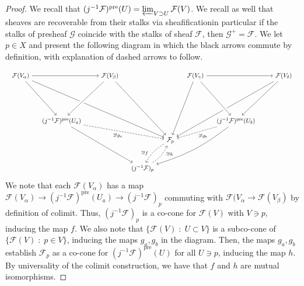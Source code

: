 \documentclass[english,letter,doublesided]{article}
\newcommand{\Fcal}{\mathcal{F}}
\newcommand{\Gcal}{\mathcal{G}}
\theoremstyle{remark}
\theoremstyle{definition}
\newcommand{\clim}{\varprojlim}
\newcommand{\pre}{\mathrm{pre}}
\begin{document}
\begin{proof}
	We recall that $(j^{-1}\Fcal)^{\pre}(U)=\clim_{V\supset U}\Fcal(V)$. We recall as well that sheaves are recoverable from their stalks via sheafification\textemdash in particular if the stalks of presheaf $\Gcal$ coincide with the stalks of sheaf $\Fcal$, then $\Gcal^+=\Fcal.$ We let $p\in X$ and present the following diagram in which the black arrows commute by definition, with explanation of dashed arrows to follow.
	
	$$
	\begin{tikzcd}[row sep=scriptsize, column sep=tiny]
	&\Fcal(V_\alpha)\arrow[rrrrrr]\arrow[ddddrr]\arrow[dddddrrrrrrrrrr]&&&&&&\Fcal(V_\beta)\arrow[ddddllll,crossing over]\arrow[dddddrrrr]&&&&&&\Fcal(V_\gamma)\arrow[rrrrrr]\arrow[dddddll]&&&&&&\Fcal(V_\delta)\arrow[ddddllll]\arrow[dddddllllllll]&\\%
	&&&&&&&&&&&&&&&&&&&\\%
	&&&&&&&&&&&&&&&&&&&\\%
	&&&&&&&&&&&&&&&&&&&\\%
	&&&(j^{-1}\Fcal)^{\pre}(U_a)\arrow[dddrrrrrr]\arrow[drrrrrrrr,dashrightarrow,swap,"\exists!g_a"]&&&&&&&&&&&&(j^{-1}\Fcal)^{\pre}(U_b)\arrow[dllll,dashrightarrow,"\exists!g_b"]\arrow[from=uuuull,crossing over]\arrow[dddllllll, bend left =10]&&&&&\\%
	&&&&&&&&&&&\Fcal_p\arrow[ddll,bend right=15,dashrightarrow, near end, swap, "\exists! f"]&&&&&&&&\\%
	&&&&&&&&&&&&&&&&&&&\\%
	&&&&&&&&&(j^{-1}\Fcal)_p\arrow[uurr,bend right=15,dashrightarrow,near end, swap, "\exists! h"]&&&&&&&&&&%
	\end{tikzcd}$$
	We note that each $\Fcal(V_\alpha)$ has a map $\Fcal(V_\alpha)\to (j^{-1}\Fcal)^\pre(U_a)\to(j^{-1}\Fcal)_p$ commuting with $\Fcal(V_\alpha \to \Fcal(V_\beta)$ by definition of colimit. Thus, $(j^{-1}\Fcal)_p$ is a co-cone for $\Fcal(V)$ with $V\ni p$, inducing the map $f$. We also note that $\{\Fcal(V)\;:\;U\subset V\}$ is a subco-cone of $\{\Fcal(V)\;:\;p\in V\}$, inducing the maps $g_a,g_b$ in the diagram. Then, the maps $g_a,g_b$ establish $\Fcal_p$ as a co-cone for $(j^{-1}\Fcal)^{\pre}(U)$ for all $U\ni p$, inducing the map $h$. By universality of the colimit construction, we have that $f$ and $h$ are mutual isomorphisms.   
	
\end{proof}
\end{document}

